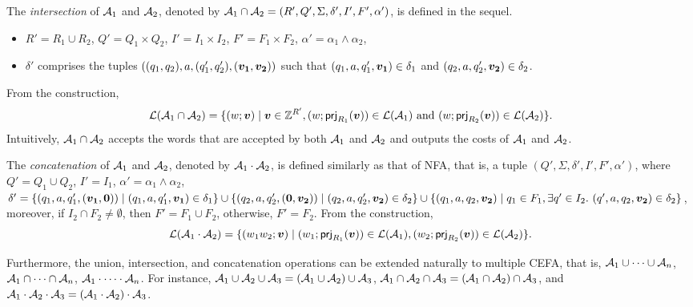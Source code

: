 The \emph{intersection} of $\mathcal{A}_1$ and $\mathcal{A}_2$, denoted by $\mathcal{A}_1 \cap \mathcal{A}_2 = (R', Q', \Sigma, \delta', I', F', \alpha')$, is defined in the sequel. 
\begin{itemize}
\item $R' = R_1 \cup R_2$, $Q' = Q_1 \times Q_2$, $I' = I_1 \times I_2$, $F' = F_1 \times F_2$, $\alpha' = \alpha_1 \wedge \alpha_2$, 
%
%
\item $\delta'$ comprises the tuples $((q_1, q_2), a, (q'_1, q'_2), (\myvec{v_1}, \myvec{v_2}))$ such that $(q_1,a, q'_1, \myvec{v_1}) \in \delta_1$ and $(q_2,a, q'_2, \myvec{v_2}) \in \delta_2$.
\end{itemize}
From the construction, 
$$\Lang(\aut_1 \cap \aut_2) = \{(w; \myvec{v}) \mid \myvec{v} \in \Int^{R'}, (w; \prj_{R_1}(\myvec{v})) \in \Lang(\aut_1) \mbox{ and } (w; \prj_{R_2}(\myvec{v})) \in \Lang(\aut_2)\}.$$ 
Intuitively, $\mathcal{A}_1 \cap \mathcal{A}_2$ accepts the words that are accepted by both $\mathcal{A}_1$ and $\mathcal{A}_2$ and outputs the costs of $\mathcal{A}_1$ and $\mathcal{A}_2$.  

The \emph{concatenation} of $\mathcal{A}_1$ and $\mathcal{A}_2$, denoted by $\mathcal{A}_1 \cdot \mathcal{A}_2$, is defined similarly as that of NFA, that is, a tuple $(Q', \Sigma, \delta', I', F', \alpha')$, where $Q' = Q_1 \cup Q_2$, $I' = I_1$, $\alpha' = \alpha_1 \wedge \alpha_2$, $\delta' = \{(q_1, a, q'_1, (\myvec{v_1}, \myvec{0})) \mid (q_1, a, q'_1, \myvec{v_1}) \in \delta_1\} \cup \{(q_2, a, q'_2, (\myvec{0}, \myvec{v_2})) \mid (q_2, a, q'_2, \myvec{v_2}) \in \delta_2\} \cup \{(q_1, a, q_2, \vec{v_2}) \mid q_1 \in F_1, \exists q' \in I_2.\ (q', a, q_2, \vec{v_2}) \in \delta_2\}$, moreover, if $I_2 \cap F_2 \neq \emptyset$, then $F'= F_1 \cup F_2$, otherwise, $F'= F_2$. From the construction, 
$$\Lang(\aut_1 \concat \aut_2) = \{(w_1w_2; \myvec{v}) \mid (w_1; \prj_{R_1}(\myvec{v})) \in \Lang(\aut_1), (w_2; \prj_{R_2}(\myvec{v})) \in \Lang(\aut_2)\}.$$

Furthermore, the union, intersection, and concatenation operations can be extended naturally to multiple CEFA, that is, $\mathcal{A}_1 \cup \cdots \cup \mathcal{A}_n$, $\mathcal{A}_1 \cap \cdots \cap \mathcal{A}_n$, $\mathcal{A}_1 \cdot \cdots \cdot \mathcal{A}_n$. For instance, $\mathcal{A}_1 \cup \mathcal{A}_2 \cup \mathcal{A}_3 = (\mathcal{A}_1 \cup \mathcal{A}_2) \cup \mathcal{A}_3$, $\mathcal{A}_1 \cap \mathcal{A}_2 \cap \mathcal{A}_3 = (\mathcal{A}_1 \cap \mathcal{A}_2) \cap \mathcal{A}_3$, and $\mathcal{A}_1 \cdot \mathcal{A}_2 \cdot \mathcal{A}_3 = (\mathcal{A}_1 \cdot \mathcal{A}_2) \cdot \mathcal{A}_3$.

